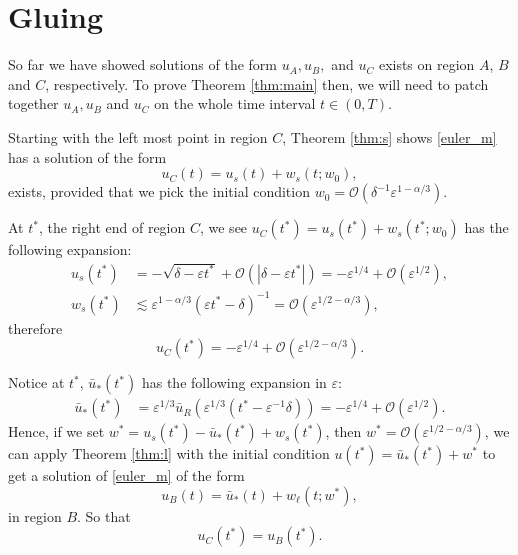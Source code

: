 \documentclass[letterpaper,11pt]{article}
\newcommand{\rmO}{\mathcal{O}}
\newcommand{\eps}{\varepsilon}
\newcommand{\lar}{ \lesssim }
\numberwithin{equation}{section}
\theoremstyle{plain}
\begin{document}
\section{Gluing}\label{sec_glue}
So far we have showed solutions of the form $u_A,u_B,$ and $u_C$ exists on region $A$, $B$ and $C$, respectively. To prove Theorem \ref{thm:main} then, we will need to patch together $u_A, u_B$ and $u_C$ on the whole time interval $t \in (0,T)$.

Starting with the left most point in region $C$, Theorem \ref{thm:s} shows \eqref{euler_m} has
a solution of the form
\[
u_C(t) = u_s(t) + w_s(t;w_0),
\]
exists, provided that we pick the initial condition $w_0= \rmO(\delta^{-1}\eps^{1-\alpha/3})$.

At $t^*$, the right end of region $C$, we see $u_C(t^*) = u_s(t^*) + w_s(t^*; w_0)$ has the following expansion:
\begin{align*}
u_s(t^*) &= -\sqrt{\delta-\eps t^*}+\rmO(|\delta-\eps t^*|) = -\eps^{1/4}+\rmO(\eps^{1/2}),\\
w_s(t^*) &\lar \eps^{1-\alpha/3}(\eps t^*-\delta)^{-1} =  \rmO(\eps^{1/2-\alpha/3}),
\end{align*}
therefore
\[
 u_C(t^*) = -\eps^{1/4} + \rmO(\eps^{1/2-\alpha/3}).
\]

Notice at $t^*$, $\bar{u}_*(t^*)$ has the following expansion in $\eps$:
\begin{align*}
\bar{u}_*(t^*) &= \eps^{1/3}\bar{u}_R(\eps^{1/3}(t^*-\eps^{-1}\delta)) = -\eps^{1/4}+ \rmO(\eps^{1/2}).
\end{align*}
Hence, if we set $w^* = u_s(t^*)-\bar{u}_*(t^*)+w_s(t^*)$, then $w^* = \rmO(\eps^{1/2-\alpha/3})$, we can apply Theorem \ref{thm:l} with the initial condition $u(t^*)=  \bar{u}_*(t^*) + w^*$ to get a solution of \eqref{euler_m} of the form
\[
u_B(t) = \bar{u}_*(t) + w_\ell(t; w^*),
\]
in region $B$. So that
\begin{equation} \label{match_bc}
u_C(t^*) = u_B(t^*).
\end{equation}
\end{document}
